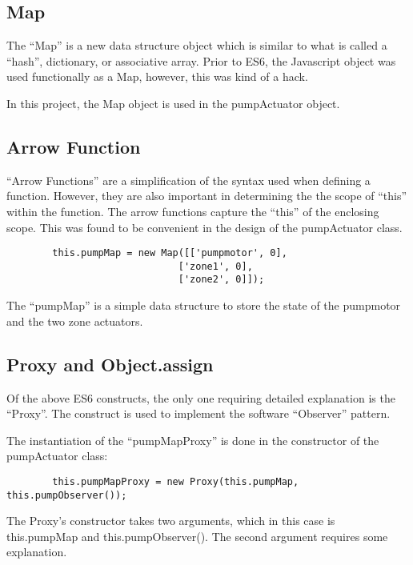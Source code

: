 \subsection{Map}

The ``Map'' is a new data structure object which is similar to what is called a 
``hash'', dictionary, or associative array.  Prior to ES6, the Javascript 
object was used functionally as a Map, however, this was kind of a hack.

In this project, the Map object is used in the pumpActuator object.

\subsection{Arrow Function}

``Arrow Functions'' are a simplification of the syntax used when defining a 
function.  However, they are also important in determining the the scope of 
``this'' within the function.  The arrow functions capture the ``this'' of the 
enclosing scope.  This was found to be convenient in the design of the 
pumpActuator class.

\begin{verbatim}
        this.pumpMap = new Map([['pumpmotor', 0],
                              ['zone1', 0],
                              ['zone2', 0]]);
\end{verbatim}

The ``pumpMap'' is a simple data structure to store the state of the pumpmotor 
and the two zone actuators.

\subsection{Proxy and Object.assign}

Of the above ES6 constructs, the only one requiring detailed explanation is the 
``Proxy''.  The construct is used to implement the software ``Observer'' 
pattern.

The instantiation of the ``pumpMapProxy'' is done in the constructor of the 
pumpActuator class:

\begin{verbatim}
        this.pumpMapProxy = new Proxy(this.pumpMap, this.pumpObserver());
\end{verbatim}

The Proxy's constructor takes two arguments, which in this case is this.pumpMap 
and this.pumpObserver().  The second argument requires some explanation.


